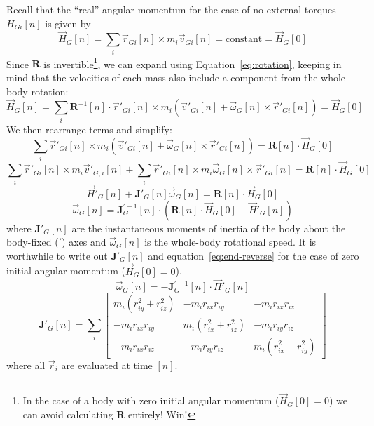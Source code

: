 Recall that the ``real'' angular momentum for the case of no external torques $H_{Gi}[n]$ is given by
\begin{equation}
\vec{H}_{G}[n] = \sum_i \vec{r}_{Gi}[n] \times m_i \vec{v}_{Gi}[n] = \mbox{constant} = \vec{H}_G[0]
\end{equation}
Since $\mathbf{R}$ is invertible\footnote{In the case of a body with zero initial angular momentum ($\vec{H}_G[0] = 0$) we can avoid calculating $\mathbf{R}$ entirely! Win!}, we can expand using Equation~\ref{eq:rotation}, keeping in mind that the velocities of each mass also include a component from the whole-body rotation:
\begin{equation}
\vec{H}_{G}[n] = \sum_i \mathbf{R}^{-1}[n] \cdot \vec{r}'_{Gi}[n] \times m_i (\vec{v}'_{Gi}[n] + \vec\omega_G[n] \times \vec{r}'_{Gi}[n] ) = \vec{H}_G[0]
\end{equation}
We then rearrange terms and simplify: 
\begin{equation}
\sum_i \vec{r}'_{Gi}[n] \times m_i (\vec{v}'_{Gi}[n] + \vec\omega_G[n] \times \vec{r}'_{Gi}[n]) = 
\mathbf{R}[n] \cdot \vec{H}_G[0] 
\end{equation}
\begin{equation}
\sum_i \vec{r}'_{Gi}[n] \times m_i \vec{v}'_{G,i}[n] + 
\sum_i \vec{r}'_{Gi}[n] \times m_i \vec\omega_G[n] \times \vec{r}'_{Gi}[n] = 
\mathbf{R}[n] \cdot \vec{H}_G[0] 
\end{equation}
\begin{equation}
\vec{H}'_G[n] +
\mathbf{J}'_G[n] \vec\omega_G[n] = \mathbf{R}[n] \cdot \vec{H}_G[0] 
\end{equation}
\begin{equation}
\vec\omega_G[n] = 
\mathbf{J}_G^{\prime -1}[n] \cdot (\mathbf{R}[n] \cdot \vec{H}_G[0]
-\vec{H}'_G[n]) 
\label{eq:end-reverse}
\end{equation}
where $\mathbf{J}'_G[n]$ are the instantaneous moments of inertia of the body about the body-fixed ($'$) axes and $\vec\omega_G[n]$ is the whole-body rotational speed. It is worthwhile to write out $\mathbf{J}'_G[n]$ and equation~\ref{eq:end-reverse} for the case of zero initial angular momentum ($\vec{H}_G[0]=0$). 
\begin{equation}
\vec\omega_G[n] = 
- \mathbf{J}_G^{\prime -1}[n] \cdot 
\vec{H}'_G[n] 
\label{eq:end-reverse1}
\end{equation}
\begin{equation}
\mathbf{J}'_G[n] = 
\sum_i \begin{bmatrix}
m_i (r_{iy}^2+r_{iz}^2) & -m_i r_{ix} r_{iy} & -m_i r_{ix} r_{iz} \\
-m_i r_{ix} r_{iy} & m_i (r_{ix}^2+r_{iz}^2) & -m_i r_{iy} r_{iz} \\
-m_i r_{ix} r_{iz} & -m_i r_{iy} r_{iz} & m_i (r_{ix}^2+r_{iy}^2) 
\end{bmatrix}
\label{eq:Jn}
\end{equation}
where all $\vec{r}_i$ are evaluated at time $[n]$.  

